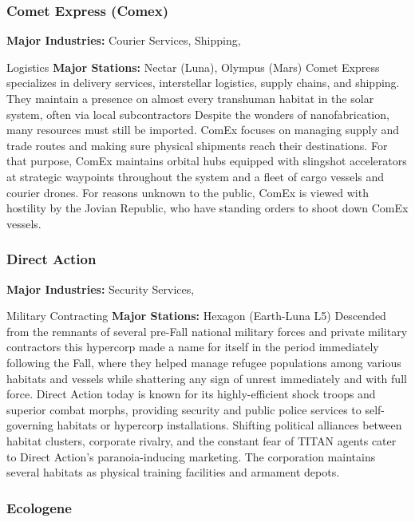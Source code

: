 \subsubsection{Comet Express (Comex)}

\textbf{Major Industries:} Courier Services, Shipping, 

Logistics
\textbf{Major Stations:} Nectar (Luna), Olympus (Mars)
Comet Express specializes in delivery services, interstellar
logistics, supply chains, and shipping. They
maintain a presence on almost every transhuman 
habitat in the solar system, often via local subcontractors
Despite the wonders of nanofabrication, many
resources must still be imported. ComEx focuses on 
managing supply and trade routes and making sure 
physical shipments reach their destinations. For that 
purpose, ComEx maintains orbital hubs equipped 
with slingshot accelerators at strategic waypoints 
throughout the system and a fleet of cargo vessels 
and courier drones. For reasons unknown to the 
public, ComEx is viewed with hostility by the Jovian 
Republic, who have standing orders to shoot down 
ComEx vessels.

\subsubsection{Direct Action}

\textbf{Major Industries:} Security Services, 

Military Contracting
\textbf{Major Stations:} Hexagon (Earth-Luna L5)
Descended from the remnants of several pre-Fall 
national military forces and private military contractors
this hypercorp made a name for itself in the
period immediately following the Fall, where they 
helped manage refugee populations among various 
habitats and vessels while shattering any sign of 
unrest immediately and with full force. Direct Action 
today is known for its highly-efficient shock troops 
and superior combat morphs, providing security and 
public police services to self-governing habitats or 
hypercorp installations. Shifting political alliances 
between habitat clusters, corporate rivalry, and the 
constant fear of TITAN agents cater to Direct Action's 
paranoia-inducing marketing. The corporation maintains
several habitats as physical training facilities and
armament depots.

\subsubsection{Ecologene}

